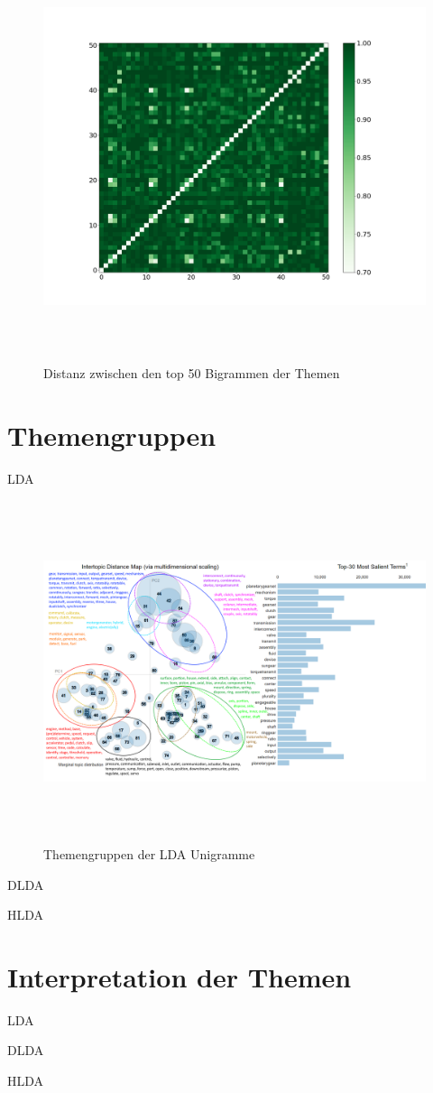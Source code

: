 \begin{figure}[htpb]
	\centering
	\includegraphics[width=\textwidth,height=12cm,keepaspectratio=true]{img/bigram_jaccard_50_green_07.png}
	\caption{
		Distanz zwischen den top 50 Bigrammen der Themen
	}
	\label{fig:Distanz_Bigramme}
\end{figure}


\section{Themengruppen}

LDA

\begin{figure}[htpb]
	\centering
	\includegraphics[width=\textwidth,height=10cm,keepaspectratio=true]{img/LDAvisGM-3-1-1clustered.png}
	\caption{
		Themengruppen der LDA Unigramme
	}
	\label{fig:Themengruppen_LDA_Unigramm}
\end{figure}


DLDA

HLDA

\section{Interpretation der Themen}

LDA

DLDA

HLDA
